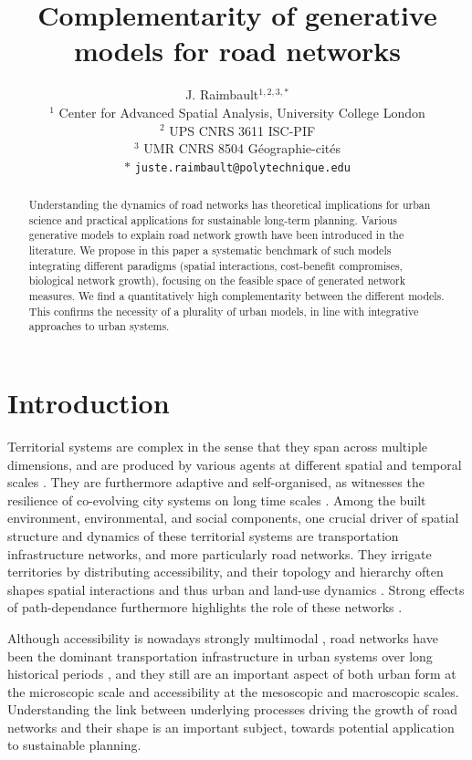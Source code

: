 \documentclass{article}
\title{Complementarity of generative models for road networks}
\author{J. Raimbault$^{1,2,3,\ast}$\\
$^{1}$ Center for Advanced Spatial Analysis, University College London\\
$^{2}$ UPS CNRS 3611 ISC-PIF\\
$^{3}$ UMR CNRS 8504 G{\'e}ographie-cit{\'e}s\medskip\\
$\ast$ \texttt{juste.raimbault@polytechnique.edu}
}
\date{}
\begin{document}
\maketitle


\begin{abstract}
	Understanding the dynamics of road networks has theoretical implications for urban science and practical applications for sustainable long-term planning. Various generative models to explain road network growth have been introduced in the literature. We propose in this paper a systematic benchmark of such models integrating different paradigms (spatial interactions, cost-benefit compromises, biological network growth), focusing on the feasible space of generated network measures. We find a quantitatively high complementarity between the different models. This confirms the necessity of a plurality of urban models, in line with integrative approaches to urban systems.
\end{abstract}




\section{Introduction}


Territorial systems are complex in the sense that they span across multiple dimensions, and are produced by various agents at different spatial and temporal scales \cite{batty2007complexity}. They are furthermore adaptive and self-organised, as witnesses the resilience of co-evolving city systems on long time scales \cite{pumain2021co}. Among the built environment, environmental, and social components, one crucial driver of spatial structure and dynamics of these territorial systems are transportation infrastructure networks, and more particularly road networks. They irrigate territories by distributing accessibility, and their topology and hierarchy often shapes spatial interactions and thus urban and land-use dynamics \cite{wegener2004land}. Strong effects of path-dependance furthermore highlights the role of these networks \cite{ribeill1985aspects}.

Although accessibility is nowadays strongly multimodal \cite{cats2021multi}, road networks have been the dominant transportation infrastructure in urban systems over long historical periods \cite{verdier2007extension}, and they still are an important aspect of both urban form at the microscopic scale and accessibility at the mesoscopic and macroscopic scales. Understanding the link between underlying processes driving the growth of road networks and their shape is an important subject, towards potential application to sustainable planning.
\end{document}
